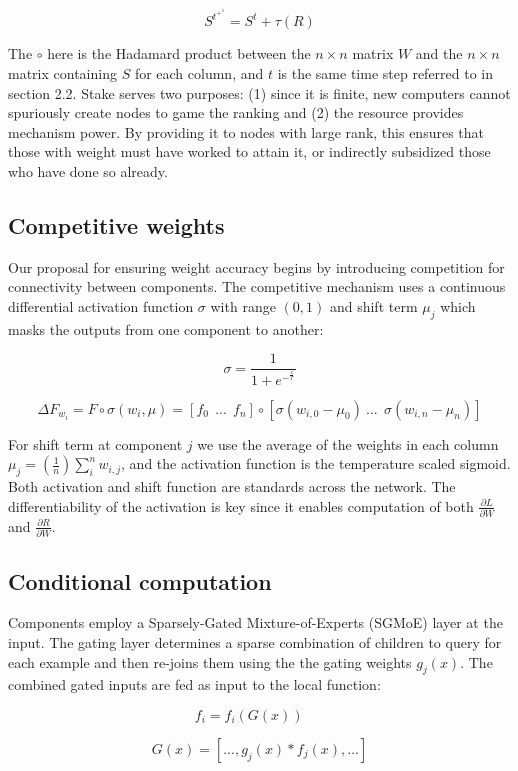 \documentclass{article}
\begin{document}
\[ S^t^+^1 = S^t + \tau (R) \] 

The $\circ$ here is the Hadamard product between the $n \times n$ matrix $W$ and the $n \times n$ matrix containing $S$ for each column, and $t$ is the same time step referred to in section 2.2. Stake serves two purposes: (1) since it is finite, new computers cannot spuriously create nodes to game the ranking and (2) the resource provides mechanism power. By providing it to nodes with large rank, this ensures that those with weight must have worked to attain it, or indirectly subsidized those who have done so already.

\subsection{Competitive weights}

Our proposal for ensuring weight accuracy begins by introducing competition for connectivity between components. The competitive mechanism uses a continuous differential activation function $\sigma$ with range $(0,1)$ and shift term $\mu_j$ which masks the outputs from one component to another:
\bigskip

\[\sigma =  \frac{1}{ 1 + e^-^\frac{x}{T}} \]

\[\Delta F_w_i = F \circ \sigma(w_i, \mu) = [f_0 \ \ ... \ \ f_n] \circ [\sigma(w_{i,0} - \mu_0) \   ... \ \ \sigma(w_{i,n} - \mu_n)] \]

For shift term at component $j$ we use the average of the weights in each column $\mu_j = (\frac{1}{n}) \sum_{i}^{n}{w_{i,j}}$, and the activation function is the temperature scaled sigmoid. Both activation and shift function are standards across the network. The differentiability of the activation is key since it enables computation of both $\frac{\partial L}{\partial W}$ and $\frac{\partial R}{\partial W}$. 

\subsection{Conditional computation}

Components employ a Sparsely-Gated Mixture-of-Experts (SGMoE) layer at the input. The gating layer determines a sparse combination of children to query for each example and then re-joins them using the the gating weights $g_j(x)$. The combined gated inputs are fed as input to the local function: 

\[f_i = f_i(G(x)) \ \ \ \  \textrm{ }\]

\[ G(x) = [ ..., g_j(x) * f_j(x), ...] \]
\end{document}
